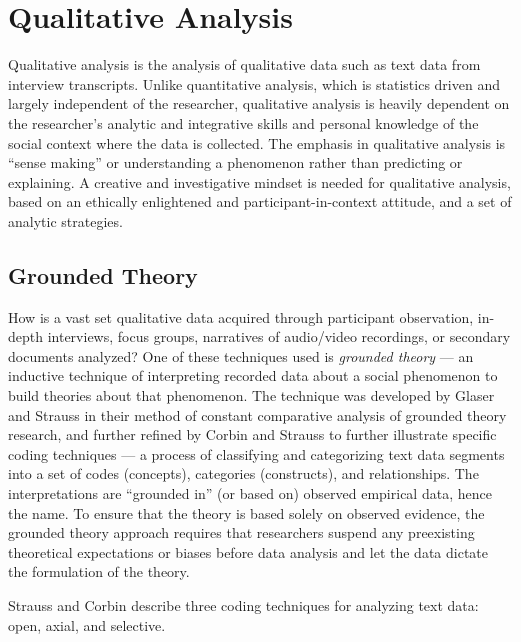 \section{Qualitative Analysis}

Qualitative analysis is the analysis of qualitative data such as text data from interview transcripts. Unlike quantitative analysis, which is statistics driven and largely independent of the researcher, qualitative analysis is heavily dependent on the researcher's analytic and integrative skills and personal knowledge of the social context where the data is collected. The emphasis in qualitative analysis is ``sense making'' or understanding a phenomenon rather than predicting or explaining. A creative and investigative mindset is needed for qualitative analysis, based on an ethically enlightened and participant-in-context attitude, and a set of analytic strategies. 

\subsection{Grounded Theory}

How is a vast set qualitative data acquired through participant observation, in-depth interviews, focus groups, narratives of audio/video recordings, or secondary documents analyzed? One of these techniques used is \textit{grounded theory} --- an inductive technique of interpreting recorded data about a social phenomenon to build theories about that phenomenon. The technique was developed by Glaser and Strauss\cite{glaser1967discovery} in their method of constant comparative analysis of grounded theory research, and further refined by Corbin and Strauss\cite{corbin1990grounded} to further illustrate specific coding techniques --- a process of classifying and categorizing text data segments into a set of codes (concepts), categories (constructs), and relationships. The interpretations are ``grounded in'' (or based on) observed empirical data, hence the name. To ensure that the theory is based solely on observed evidence, the grounded theory approach requires that researchers suspend any preexisting theoretical expectations or biases before data analysis and let the data dictate the formulation of the theory.

Strauss and Corbin\cite{strauss1998basics} describe three coding techniques for analyzing text data: open, axial, and selective. 

